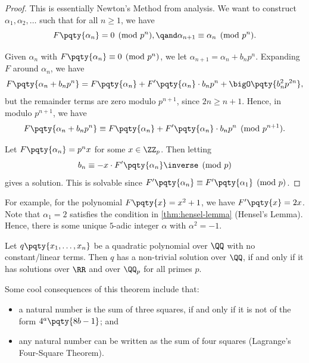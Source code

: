 \begin{proof}
    This is essentially Newton's Method from analysis. We want to construct \(\alpha_1, \alpha_2, \ldots\) such that for all \(n \geq 1\), we have
    \[
        F\pqty{\alpha_n} = 0 \pmod{p^n}, \qand \alpha_{n + 1} \equiv \alpha_n \pmod{p^n}.
    \]

    Given \(\alpha_n\) with \(F\pqty{\alpha_n} \equiv 0 \pmod{p^n}\), we let \(\alpha_{n + 1} = \alpha_n + b_n p^n\). Expanding \(F\) around \(\alpha_n\), we have
    \[
        F\pqty{\alpha_n + b_n p^n} = F\pqty{\alpha_n} + F'\pqty{\alpha_n} \cdot b_n p^n + \bigO\pqty{b_n^2 p^{2n}},
    \]
    but the remainder terms are zero modulo \(p^{n + 1}\), since \(2n \geq n + 1\). Hence, in modulo \(p^{n + 1}\), we have
    \[
        F\pqty{\alpha_n + b_n p^n} \equiv F\pqty{\alpha_n} + F'\pqty{\alpha_n} \cdot b_n p^n \pmod{p^{n + 1}}.
    \]

    Let \(F\pqty{\alpha_n} = p^n x\) for some \(x \in \ZZ_p\). Then letting
    \[
        b_n \equiv -x \cdot F'\pqty{\alpha_n}\inverse \pmod{p}
    \]
    gives a solution. This is solvable since \(F'\pqty{\alpha_n} \equiv F'\pqty{\alpha_1} \pmod{p}\).
\end{proof}

For example, for the polynomial \(F\pqty{x} = x^2 + 1\), we have \(F'\pqty{x} = 2x\). Note that \(\alpha_1 = 2\) satisfies the condition in \autoref{thm:hensel-lemma} (Hensel's Lemma). Hence, there is some unique \(5\)-adic integer \(\alpha\) with \(\alpha^2 = -1\).

\begin{theorem}
    \label{thm:hasse-minkowski}%
    Let \(q\pqty{x_1, \ldots, x_n}\) be a quadratic polynomial over \(\QQ\) with no constant/linear terms. Then \(q\) has a non-trivial solution over \(\QQ\), if and only if it has solutions over \(\RR\) and over \(\QQ_p\) for all primes \(p\).
\end{theorem}

Some cool consequences of this theorem include that:
\begin{itemize}
    \item a natural number is the sum of three squares, if and only if it is not of the form \(4^a \pqty{8b - 1}\); and
    \item any natural number can be written as the sum of four squares (Lagrange's Four-Square Theorem).
\end{itemize} 